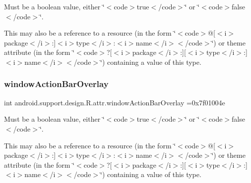 Must be a boolean value, either \char`\"{}$<$code$>$true$<$/code$>$\char`\"{} or \char`\"{}$<$code$>$false$<$/code$>$\char`\"{}. 

This may also be a reference to a resource (in the form \char`\"{}$<$code$>$@\mbox{[}$<$i$>$package$<$/i$>$\+:\mbox{]}$<$i$>$type$<$/i$>$\+:$<$i$>$name$<$/i$>$$<$/code$>$\char`\"{}) or theme attribute (in the form \char`\"{}$<$code$>$?\mbox{[}$<$i$>$package$<$/i$>$\+:\mbox{]}\mbox{[}$<$i$>$type$<$/i$>$\+:\mbox{]}$<$i$>$name$<$/i$>$$<$/code$>$\char`\"{}) containing a value of this type. \mbox{\label{classandroid_1_1support_1_1design_1_1R_1_1attr_a2dd003742e176a3aca66a2d4064b7bab}} 
\subsubsection{\texorpdfstring{window\+Action\+Bar\+Overlay}{windowActionBarOverlay}}
{\footnotesize\ttfamily int android.\+support.\+design.\+R.\+attr.\+window\+Action\+Bar\+Overlay =0x7f01004e\hspace{0.3cm}{\ttfamily [static]}}

Must be a boolean value, either \char`\"{}$<$code$>$true$<$/code$>$\char`\"{} or \char`\"{}$<$code$>$false$<$/code$>$\char`\"{}. 

This may also be a reference to a resource (in the form \char`\"{}$<$code$>$@\mbox{[}$<$i$>$package$<$/i$>$\+:\mbox{]}$<$i$>$type$<$/i$>$\+:$<$i$>$name$<$/i$>$$<$/code$>$\char`\"{}) or theme attribute (in the form \char`\"{}$<$code$>$?\mbox{[}$<$i$>$package$<$/i$>$\+:\mbox{]}\mbox{[}$<$i$>$type$<$/i$>$\+:\mbox{]}$<$i$>$name$<$/i$>$$<$/code$>$\char`\"{}) containing a value of this type. \mbox{\label{classandroid_1_1support_1_1design_1_1R_1_1attr_a636b996e7c817a05b1b9d5726df2cbde}} 
